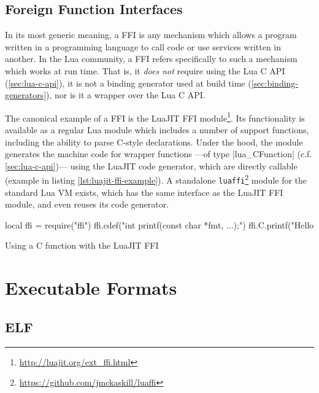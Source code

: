 \subsection{Foreign Function Interfaces}
	\label{sec:ffis}

In its most generic meaning, a \gls{FFI} is any mechanism which allows
a program written in a programming language to call code or use services
written in another. In the Lua community, a FFI refers specifically to such
a mechanism which works at run time. That is, it \emph{does not} require using
the Lua C API (\autoref{sec:lua-c-api}), it is not a binding generator used at
build time (\autoref{sec:binding-generators}), nor is it a wrapper over the
Lua C API.

The canonical example of a FFI is the \gls{LuaJIT} FFI
module\footnote{\url{http://luajit.org/ext_ffi.html}}. Its functionality is
available  as a regular Lua module which includes a number of support
functions, including the ability to parse C-style declarations. Under the
hood, the module generates the machine code for wrapper functions —of type
\Mc|lua_CFunction| (c.f. \autoref{sec:lua-c-api})— using the LuaJIT code
generator, which are directly callable (example in listing
\autoref{lst:luajit-ffi-example}). A standalone
\verb|luaffi|\footnote{\url{https://github.com/jmckaskill/luaffi}} module for
the standard Lua \gls{VM} exists, which has the same interface as the LuaJIT
FFI module, and even reuses its code generator.

\begin{listing}
	\begin{luacode}
  local ffi = require("ffi")
  ffi.cdef("int printf(const char *fmt, ...);")
  ffi.C.printf("Hello %
	\end{luacode}
	\caption{Using a C function with the LuaJIT FFI}
	\label{lst:luajit-ffi-example}
\end{listing}


%

\section{Executable Formats}

\subsection{ELF}

